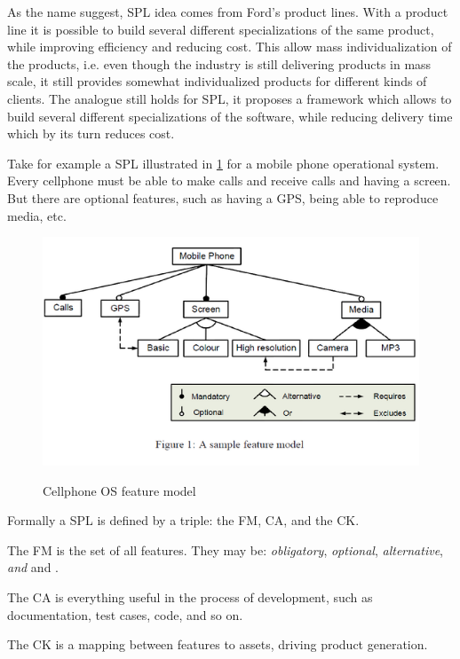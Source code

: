 As the name suggest, \gls{SPL} idea comes from Ford's product lines. With a product line
it is possible to build several different specializations of the same product, while
improving efficiency and reducing cost. This allow mass individualization of the products, i.e. even though the industry is still delivering products in mass scale,
it still provides somewhat individualized products for different kinds of clients.
The analogue still holds for \gls{SPL}, it proposes a framework which allows to build
several different specializations of the software, 
while reducing delivery time which by its turn reduces cost.

Take for example a \gls{SPL} illustrated in \ref{fig:cellphone-fm} for a mobile phone operational system. 
Every cellphone must be able to make calls and receive calls and having a screen. 
But there are optional features, such as having a GPS, being able to reproduce media,
etc.

\begin{figure}
\centering
\includegraphics[scale=0.35]{doc/images/mobile-spl}
\label{fig:cellphone-fm}
\caption{Cellphone OS feature model} 
\end{figure} 

Formally a \gls{SPL} is defined by a triple: the \gls{FM}, \gls{CA},
and the \gls{CK}.

The \gls{FM} is the set of all features. They may be: \emph{obligatory}, \emph{optional}, \emph{alternative}, \emph{and} and .

The \gls{CA} is everything useful in the process of development, such as documentation, test cases, code, and so on.

The \gls{CK} is a mapping between features to assets, driving product generation.

